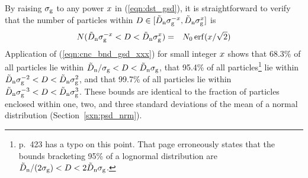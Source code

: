 \documentclass[12pt,twoside]{article}
\begin{document}
By raising $\sigma_{\mathrm{g}}$ to any power $x$ in (\ref{eqn:dst_gsd}), it is 
straightforward to verify that the number of particles within
$D \in [\tilde{D}_{\mathrm{n}}\sigma_{\mathrm{g}}^{-x}, \tilde{D}_{\mathrm{n}}\sigma_{\mathrm{g}}^{x}]$ is
\begin{eqnarray}
N(\tilde{D}_{\mathrm{n}}\sigma_{\mathrm{g}}^{-x} < D < \tilde{D}_{\mathrm{n}}\sigma_{\mathrm{g}}^{x}) & = & 
N_{0} \,\mathrm{erf}(x/\sqrt{2})
\label{eqn:cnc_bnd_gsd_xxx}
\end{eqnarray}
Application of (\ref{eqn:cnc_bnd_gsd_xxx}) for small integer $x$
shows 
that 68.3\% of all particles lie within 
$\tilde{D}_{\mathrm{n}}/\sigma_{\mathrm{g}} < D < \tilde{D}_{\mathrm{n}}\sigma_{\mathrm{g}}$, 
that 95.4\% of all particles\footnote{%
\cite{SeP97} p.~423 has a typo on this point. 
That page erroneously states that the bounds bracketing 95\% of a
lognormal distribution are $\tilde{D}_{\mathrm{n}}/(2\sigma_{\mathrm{g}}) < D < 2\tilde{D}_{\mathrm{n}}\sigma_{\mathrm{g}}$.}
lie within $\tilde{D}_{\mathrm{n}}\sigma_{\mathrm{g}}^{-2} < D < \tilde{D}_{\mathrm{n}}\sigma_{\mathrm{g}}^{2}$, and 
that 99.7\% of all particles lie within 
$\tilde{D}_{\mathrm{n}}\sigma_{\mathrm{g}}^{-3} < D < \tilde{D}_{\mathrm{n}}\sigma_{\mathrm{g}}^{3}$.
These bounds are identical to the fraction of particles enclosed
within one, two, and three standard deviations of the mean of a normal  
distribution (Section~\ref{sxn:psd_nrm}). 
\end{document}
